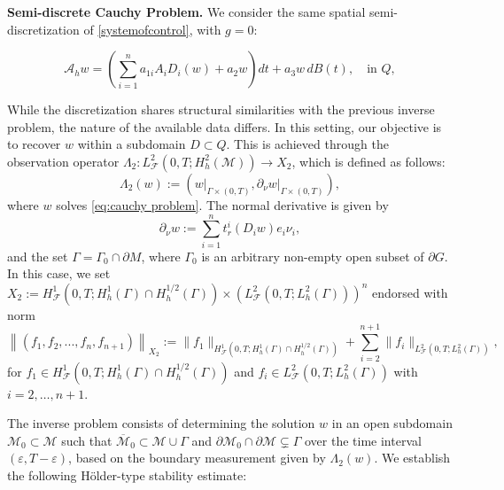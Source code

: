 \documentclass[11pt,oneside,leqno]{amsart}
\numberwithin{equation}{section}
\numberwithin{equation}{section}
\begin{document}
\textbf{Semi-discrete Cauchy Problem.} We consider the same spatial semi-discretization of \eqref{systemofcontrol}, with $g = 0$:{ 

\begin{equation}\label{eq:cauchy problem}
    \mathcal{A}_{h}w=\left(\sum_{i=1}^n a_{1i}A_iD_i(w)+a_2w\right)dt+a_3w\,dB(t),\quad \text{in } Q,
\end{equation}
}
While the discretization shares structural similarities with the previous inverse problem, the nature of the available data differs. In this setting, our objective is to recover $w$ within a subdomain $D \subset Q$. This is achieved through the observation operator $\Lambda_2: L^2_{\mathcal{F}}(0,T;H_h^2(\mathcal{M})) \to X_2 $, which is defined as follows:
\[
\Lambda_2(w) := \left(\left.w\right|_{\Gamma \times (0,T)},\left. \partial_\nu w\right|_{\Gamma \times (0,T)}\right),
\]
where $w$ solves \eqref{eq:cauchy problem}. The normal derivative is given by
\[
\partial_{\nu}w := \sum_{i=1}^n t_r^{i}(D_i w)e_i\nu_i,
\]
 and the set $\Gamma=\Gamma_0\cap\partial M$, where $\Gamma_0$ is an arbitrary non-empty open subset of $\partial G$. In this case, we set $X_2:= H^1_{\mathcal{F}}(0,T;H_h^1(\Gamma) \cap H_h^{1/2}(\Gamma)) \times \left(L^2_{\mathcal{F}}(0,T;L_h^2(\Gamma))\right)^n$ endorsed with norm $$
\left\|\left(f_1,f_2,...,f_{n},f_{n+1}\right)\right\|_{X_2}:= \|f_{1}\|_{H^1_{\mathcal{F}}(0,T;H_h^1(\Gamma) \cap H_h^{1/2}(\Gamma)) }+\sum_{i=2}^{n+1}\|f_i\|_{L^2_{\mathcal{F}}(0,T;L_h^2(\Gamma))},
$$
for $f_{1}\in H^1_{\mathcal{F}}(0,T;H_h^1(\Gamma) \cap H_h^{1/2}(\Gamma))$ and $f_i\in L^2_{\mathcal{F}}(0,T;L_h^2(\Gamma))$ with $i=2,\ldots,n+1$.

The inverse problem consists of determining the solution $w$ in an open subdomain $\mathcal{M}_0 \subset \mathcal{M}$ such that $\overline{\mathcal{M}}_0 \subset \mathcal{M} \cup \Gamma$ and $\partial \mathcal{M}_0 \cap \partial \mathcal{M} \subsetneq \Gamma$ over the time interval $(\varepsilon, T - \varepsilon)$, based on the boundary measurement given by $\Lambda_2(w)$. We establish the following Hölder-type stability estimate:
\end{document}

